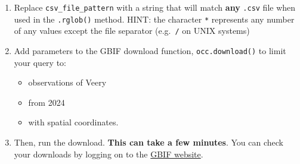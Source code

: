 \documentclass[
]{report}
\providecommand{\tightlist}{%
  \setlength{\itemsep}{0pt}\setlength{\parskip}{0pt}}
\begin{document}
\begin{tcolorbox}[enhanced jigsaw, breakable, colframe=quarto-callout-color-frame, toptitle=1mm, bottomrule=.15mm, colbacktitle=quarto-callout-color!10!white, opacityback=0, opacitybacktitle=0.6, coltitle=black, title=\textcolor{quarto-callout-color}{\faInfo}\hspace{0.5em}{Try It: Submit a request to GBIF}, left=2mm, bottomtitle=1mm, titlerule=0mm, arc=.35mm, colback=white, rightrule=.15mm, toprule=.15mm, leftrule=.75mm]

\begin{enumerate}
\def\labelenumi{\arabic{enumi}.}
\item
  Replace \texttt{csv\_file\_pattern} with a string that will match
  \textbf{any} \texttt{.csv} file when used in the \texttt{.rglob()}
  method. HINT: the character \texttt{*} represents any number of any
  values except the file separator (e.g.~\texttt{/} on UNIX systems)
\item
  Add parameters to the GBIF download function, \texttt{occ.download()}
  to limit your query to:

  \begin{itemize}
  \tightlist
  \item
    observations of Veery
  \item
    from 2024
  \item
    with spatial coordinates.
  \end{itemize}
\item
  Then, run the download. \textbf{This can take a few minutes}. You can
  check your downloads by logging on to the
  \href{https://www.gbif.org/user/download}{GBIF website}.
\end{enumerate}

\end{tcolorbox}
\end{document}
